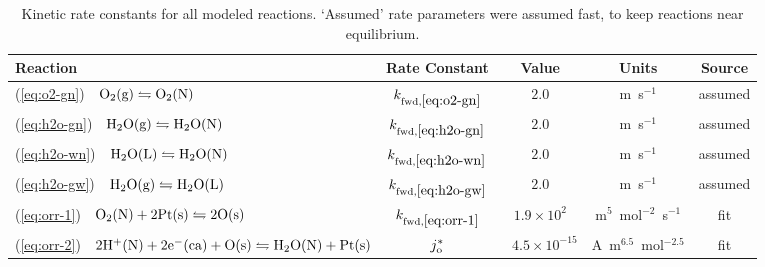 \documentclass[final,3p,times,twocolumn]{elsarticle}    %
\begin{document}
\begin{table}[!ht]
    \small
    \centering
    \caption{Kinetic rate constants for all modeled reactions. `Assumed' rate parameters were assumed fast, to keep reactions near equilibrium.}
    \vspace*{1mm}
    
    \begin{tabular}{l c c c c}
    \hline \hline
    Reaction &Rate Constant               &Value         &Units      &Source \\
    \hline
    (\ref{eq:o2-gn}) \,\, ${\rm O_2(g) \leftrightharpoons O_2(N)}$ &$k_{\rm fwd,\ref{eq:o2-gn}}$   &$2.0$ &m~s$^{-1}$ &assumed\\
    (\ref{eq:h2o-gn}) \,\, ${\rm H_2O(g) \leftrightharpoons H_2O(N)}$ &$k_{\rm fwd,\ref{eq:h2o-gn}}$ &$2.0$ &m~s$^{-1}$ &assumed\\
    (\ref{eq:h2o-wn}) \,\, ${\rm H_2O(L) \leftrightharpoons H_2O(N)}$ &$k_{\rm fwd,\ref{eq:h2o-wn}}$ &$2.0$ &m~s$^{-1}$ &assumed\\
    (\ref{eq:h2o-gw}) \,\, ${\rm H_2O(g) \leftrightharpoons H_2O(L)}$ &$k_{\rm fwd,\ref{eq:h2o-gw}}$ &$2.0$ &m~s$^{-1}$ &assumed\\
    (\ref{eq:orr-1}) \,\, ${\rm O_2(N) + 2Pt(s) \leftrightharpoons 2O(s)}$ & $k_{\rm fwd,\ref{eq:orr-1}}$ &$1.9\times10^{2}$ &m$^5$~mol$^{-2}$~s$^{-1}$ &fit\\
    (\ref{eq:orr-2}) \,\, ${\rm 2H^{+}(N) + 2e^{-}(ca) + O(s) \leftrightharpoons H_2O(N) + Pt(s)}$ &$j_{\rm o}^{*}$ &$\,\,\,\,4.5\times10^{-15}$ &A~m$^{6.5}$~mol$^{-2.5}$ &fit\\
    \hline \hline
    \end{tabular}
    \label{tab:kinetics}
\end{table}
\end{document}
